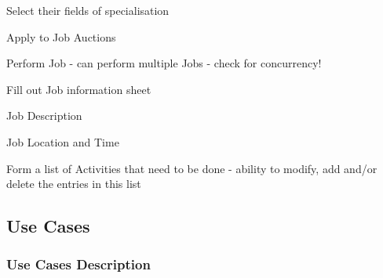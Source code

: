 \begin{packed_enum}
				\item {}
				\begin{packed_enum}
					\item Select their fields of specialisation
					\item Apply to Job Auctions
					\item Perform Job - can perform multiple Jobs - check for concurrency!
					\item Fill out Job information sheet
					\begin{packed_enum}
						\item Job Description
						\item Job Location and Time
						\item Form a list of Activities that need to be done - ability to modify, add and/or delete the entries in this list
					\end{packed_enum}
				\end{packed_enum}
				
			\end{packed_enum}
			\eject
				
			\subsection{Use Cases}
				
				\subsubsection{Use Cases Description}
					
